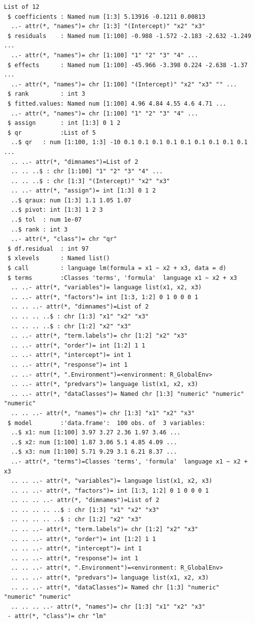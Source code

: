 \documentclass[
  letterpaper,
  DIV=11,
  numbers=noendperiod]{scrreprt}
\begin{document}
\begin{verbatim}
List of 12
 $ coefficients : Named num [1:3] 5.13916 -0.1211 0.00813
  ..- attr(*, "names")= chr [1:3] "(Intercept)" "x2" "x3"
 $ residuals    : Named num [1:100] -0.988 -1.572 -2.183 -2.632 -1.249 ...
  ..- attr(*, "names")= chr [1:100] "1" "2" "3" "4" ...
 $ effects      : Named num [1:100] -45.966 -3.398 0.224 -2.638 -1.37 ...
  ..- attr(*, "names")= chr [1:100] "(Intercept)" "x2" "x3" "" ...
 $ rank         : int 3
 $ fitted.values: Named num [1:100] 4.96 4.84 4.55 4.6 4.71 ...
  ..- attr(*, "names")= chr [1:100] "1" "2" "3" "4" ...
 $ assign       : int [1:3] 0 1 2
 $ qr           :List of 5
  ..$ qr   : num [1:100, 1:3] -10 0.1 0.1 0.1 0.1 0.1 0.1 0.1 0.1 0.1 ...
  .. ..- attr(*, "dimnames")=List of 2
  .. .. ..$ : chr [1:100] "1" "2" "3" "4" ...
  .. .. ..$ : chr [1:3] "(Intercept)" "x2" "x3"
  .. ..- attr(*, "assign")= int [1:3] 0 1 2
  ..$ qraux: num [1:3] 1.1 1.05 1.07
  ..$ pivot: int [1:3] 1 2 3
  ..$ tol  : num 1e-07
  ..$ rank : int 3
  ..- attr(*, "class")= chr "qr"
 $ df.residual  : int 97
 $ xlevels      : Named list()
 $ call         : language lm(formula = x1 ~ x2 + x3, data = d)
 $ terms        :Classes 'terms', 'formula'  language x1 ~ x2 + x3
  .. ..- attr(*, "variables")= language list(x1, x2, x3)
  .. ..- attr(*, "factors")= int [1:3, 1:2] 0 1 0 0 0 1
  .. .. ..- attr(*, "dimnames")=List of 2
  .. .. .. ..$ : chr [1:3] "x1" "x2" "x3"
  .. .. .. ..$ : chr [1:2] "x2" "x3"
  .. ..- attr(*, "term.labels")= chr [1:2] "x2" "x3"
  .. ..- attr(*, "order")= int [1:2] 1 1
  .. ..- attr(*, "intercept")= int 1
  .. ..- attr(*, "response")= int 1
  .. ..- attr(*, ".Environment")=<environment: R_GlobalEnv> 
  .. ..- attr(*, "predvars")= language list(x1, x2, x3)
  .. ..- attr(*, "dataClasses")= Named chr [1:3] "numeric" "numeric" "numeric"
  .. .. ..- attr(*, "names")= chr [1:3] "x1" "x2" "x3"
 $ model        :'data.frame':  100 obs. of  3 variables:
  ..$ x1: num [1:100] 3.97 3.27 2.36 1.97 3.46 ...
  ..$ x2: num [1:100] 1.87 3.06 5.1 4.85 4.09 ...
  ..$ x3: num [1:100] 5.71 9.29 3.1 6.21 8.37 ...
  ..- attr(*, "terms")=Classes 'terms', 'formula'  language x1 ~ x2 + x3
  .. .. ..- attr(*, "variables")= language list(x1, x2, x3)
  .. .. ..- attr(*, "factors")= int [1:3, 1:2] 0 1 0 0 0 1
  .. .. .. ..- attr(*, "dimnames")=List of 2
  .. .. .. .. ..$ : chr [1:3] "x1" "x2" "x3"
  .. .. .. .. ..$ : chr [1:2] "x2" "x3"
  .. .. ..- attr(*, "term.labels")= chr [1:2] "x2" "x3"
  .. .. ..- attr(*, "order")= int [1:2] 1 1
  .. .. ..- attr(*, "intercept")= int 1
  .. .. ..- attr(*, "response")= int 1
  .. .. ..- attr(*, ".Environment")=<environment: R_GlobalEnv> 
  .. .. ..- attr(*, "predvars")= language list(x1, x2, x3)
  .. .. ..- attr(*, "dataClasses")= Named chr [1:3] "numeric" "numeric" "numeric"
  .. .. .. ..- attr(*, "names")= chr [1:3] "x1" "x2" "x3"
 - attr(*, "class")= chr "lm"
\end{verbatim}
\end{document}

